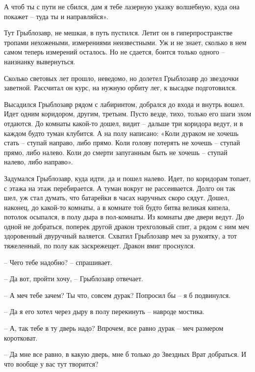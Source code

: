\documentclass[ebook,oneside,final,openright]{memoir}
\begin{document}
\par
А чтоб ты с пути не сбился, дам я тебе лазерную указку волшебную, куда она покажет – туда ты и направляйся».\par
\par
Тут Грыблозавр, не мешкая, в путь пустился. Летит он в гиперпространстве тропами нехожеными, измерениями неизвестными. Уж и не знает, сколько в нем самом теперь измерений осталось. Но не сдается, боится только одного – наизнанку вывернуться.\par
\par
Сколько световых лет прошло, неведомо, но долетел Грыблозавр до звездочки заветной. Рассчитал он курс, на нужную орбиту лег, к высадке подготовился.\par
\par
Высадился Грыблозавр рядом с лабиринтом, добрался до входа и внутрь вошел. Идет одним коридором, другим, третьим. Пусто везде, тихо, только его шаги эхом отдаются. До комнаты какой-то дошел, видит – дальше три коридора ведут, и в каждом будто туман клубится. А на полу написано: «Коли дураком не хочешь стать – ступай направо, либо прямо. Коли голову потерять не хочешь – ступай прямо, либо налево. Коли до смерти запуганным быть не хочешь – ступай налево, либо направо».\par
\par
Задумался Грыблозавр, куда идти, да и пошел налево. Идет, по коридорам топает, с этажа на этаж перебирается. А туман вокруг не рассеивается. Долго он так шел, уж стал думать, что батарейки в часах наручных скоро сядут. Дошел, наконец, до какой-то комнаты, а в комнате той будто битва великая кипела, потолок осыпался, в полу дыра в пол-комнаты. Из комнаты две двери ведут. До одной не добраться, поперек другой дракон трехголовый спит, а рядом с ним меч здоровенный двуручный валяется. Схватил Грыблозавр меч за рукоятку, а тот тяжеленный, по полу как заскрежещет. Дракон вмиг проснулся.\par
\par
– Чего тебе надобно? – спрашивает.\par
– Да вот, пройти хочу, – Грыблозавр отвечает.\par
– А меч тебе зачем? Ты что, совсем дурак? Попросил бы – я б подвинулся.\par
– Да я его хотел через дыру в полу перекинуть – навроде мостика.\par
– А, так тебе в ту дверь надо? Впрочем, все равно дурак – меч размером коротковат.\par
– Да мне все равно, в какую дверь, мне б только до Звездных Врат добраться. И что вообще у вас тут творится?\par
\end{document}
